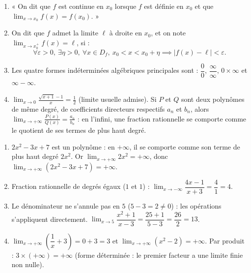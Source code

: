 \documentclass[11pt]{article}
\newcommand{\cle}[1]{{\popxbold\color{popdark}#1}}
\begin{document}
\begin{corrige}
\begin{enumerate}
\item « On dit que $f$ est \cle{continue} en $x_0$ lorsque $f$ est définie en $x_0$ et que $\displaystyle\lim_{x\to x_0}f(x)=f(x_0)$. »
\item On dit que $f$ admet la limite $\ell$ à droite en $x_0$, et on note $\lim_{x\to x_0^+}f(x)=\ell$, si :
\[ \forall \varepsilon>0,\ \exists \eta>0,\ \forall x\in D_f,\ x_0<x<x_0+\eta \implies |f(x)-\ell|<\varepsilon. \]
\item Les quatre formes indéterminées algébriques principales sont : $\dfrac{0}{0}$, $\dfrac{\infty}{\infty}$, $0\times\infty$ et $\infty-\infty$.
\item $\displaystyle\lim_{x\to 0}\frac{\sqrt{x+1}-1}{x}=\frac{1}{2}$ (limite usuelle admise). Si $P$ et $Q$ sont deux polynômes de même degré, de coefficients directeurs respectifs $a_n$ et $b_n$, alors $\displaystyle\lim_{x\to +\infty}\frac{P(x)}{Q(x)}=\frac{a_n}{b_n}$ : en l'infini, une fraction rationnelle se comporte comme le quotient de ses termes de plus haut degré.
\end{enumerate}
\end{corrige}

\begin{corrige}
\begin{enumerate}
\item $2x^2-3x+7$ est un polynôme : en $+\infty$, il se comporte comme son terme de plus haut degré $2x^2$. Or $\lim_{x\to +\infty}2x^2=+\infty$, donc $\boxed{\lim_{x\to +\infty}(2x^2-3x+7)=+\infty}$.
\item Fraction rationnelle de degrés égaux ($1$ et $1$) : $\lim_{x\to -\infty}\dfrac{4x-1}{x+3}=\dfrac{4}{1}=\boxed{4}$.
\item Le dénominateur ne s'annule pas en $5$ ($5-3=2\neq 0$) : les opérations s'appliquent directement. $\lim_{x\to 5}\dfrac{x^2+1}{x-3}=\dfrac{25+1}{5-3}=\dfrac{26}{2}=\boxed{13}$.
\item $\lim_{x\to +\infty}\left(\dfrac{1}{x}+3\right)=0+3=3$ et $\lim_{x\to +\infty}(x^2-2)=+\infty$. Par produit : $3\times(+\infty)=\boxed{+\infty}$ (forme déterminée : le premier facteur a une limite finie non nulle).
\end{enumerate}
\end{corrige}
\end{document}
